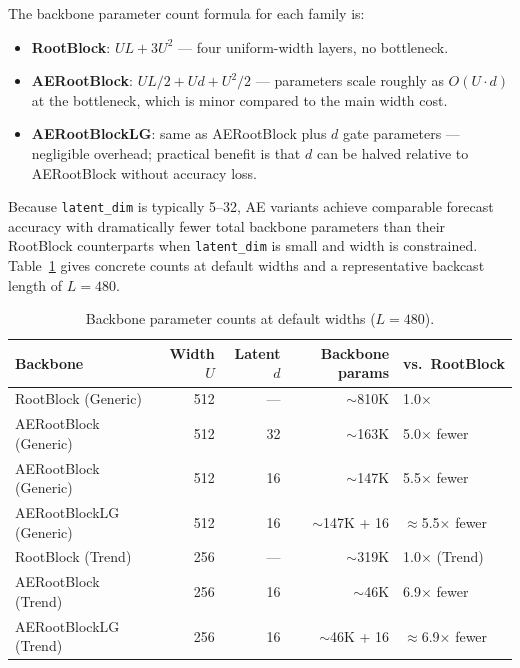 \documentclass{article}
\begin{document}
The backbone parameter count formula for each family is:
\begin{itemize}
\item \textbf{RootBlock}: $UL + 3U^2$ --- four uniform-width layers, no bottleneck.
\item \textbf{AERootBlock}: $UL/2 + Ud + U^2/2$ --- parameters scale roughly as $O(U \cdot d)$ at the bottleneck, which is minor compared to the main width cost.
\item \textbf{AERootBlockLG}: same as AERootBlock plus $d$ gate parameters --- negligible overhead; practical benefit is that $d$ can be halved relative to AERootBlock without accuracy loss.
\end{itemize}

Because \texttt{latent\_dim} is typically 5--32, AE variants achieve comparable forecast accuracy with dramatically fewer total backbone parameters than their RootBlock counterparts when \texttt{latent\_dim} is small and width is constrained. Table~\ref{tab:param-counts} gives concrete counts at default widths and a representative backcast length of $L = 480$.

\begin{table}
  \caption{Backbone parameter counts at default widths ($L = 480$).}
  \label{tab:param-counts}
  \centering
  \begin{tabular}{lrrrl}
    \toprule
    Backbone & Width $U$ & Latent $d$ & Backbone params & vs.\ RootBlock \\
    \midrule
    RootBlock (Generic)     & 512 & ---  & $\sim$810K          & 1.0$\times$ \\
    AERootBlock (Generic)   & 512 & 32   & $\sim$163K          & 5.0$\times$ fewer \\
    AERootBlock (Generic)   & 512 & 16   & $\sim$147K          & 5.5$\times$ fewer \\
    AERootBlockLG (Generic) & 512 & 16   & $\sim$147K + 16     & $\approx$5.5$\times$ fewer \\
    RootBlock (Trend)       & 256 & ---  & $\sim$319K          & 1.0$\times$ (Trend) \\
    AERootBlock (Trend)     & 256 & 16   & $\sim$46K           & 6.9$\times$ fewer \\
    AERootBlockLG (Trend)   & 256 & 16   & $\sim$46K + 16      & $\approx$6.9$\times$ fewer \\
    \bottomrule
  \end{tabular}
\end{table}
\end{document}
